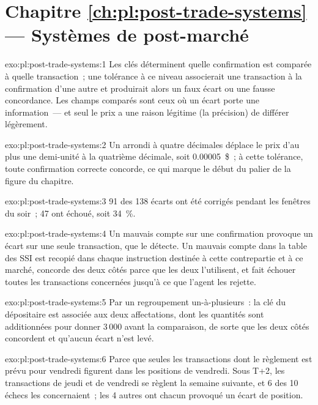 \section*{Chapitre \ref{ch:pl:post-trade-systems} --- Systèmes de post-marché}

\begin{solution}{exo:pl:post-trade-systems:1}
Les clés déterminent quelle confirmation est comparée à quelle transaction~; une tolérance à ce niveau associerait une transaction à la confirmation d'une autre et produirait alors
un faux écart ou une fausse concordance. Les champs comparés sont ceux où un écart porte une information~--- et seul le prix a une raison
légitime (la précision) de différer légèrement.
\end{solution}

\begin{solution}{exo:pl:post-trade-systems:2}
Un arrondi à quatre décimales déplace le prix d'au plus une demi-unité à la quatrième décimale, soit 0.00005~\$~; à cette tolérance, toute confirmation correcte
concorde, ce qui marque le début du palier de la figure du chapitre.
\end{solution}

\begin{solution}{exo:pl:post-trade-systems:3}
91 des 138 écarts ont été corrigés pendant les fenêtres du soir~; 47 ont échoué, soit 34~\%.
\end{solution}

\begin{solution}{exo:pl:post-trade-systems:4}
Un mauvais compte sur une confirmation provoque un écart sur une seule transaction, que le  détecte. Un mauvais compte dans la table des SSI est recopié dans chaque
instruction destinée à cette contrepartie et à ce marché, concorde des deux côtés parce que les deux l'utilisent, et fait échouer toutes les transactions concernées jusqu'à ce que l'agent
les rejette.
\end{solution}

\begin{solution}{exo:pl:post-trade-systems:5}
Par un regroupement un-à-plusieurs~: la clé du dépositaire est associée aux deux affectations, dont les quantités sont additionnées pour donner 3\,000 avant la comparaison, de sorte que
les deux côtés concordent et qu'aucun écart n'est levé.
\end{solution}

\begin{solution}{exo:pl:post-trade-systems:6}
Parce que seules les transactions dont le règlement est prévu pour vendredi figurent dans les positions de vendredi. Sous T+2, les transactions de jeudi et de vendredi se règlent la semaine suivante, et 6 des
10 échecs les concernaient~; les 4 autres ont chacun provoqué un écart de position.
\end{solution}


